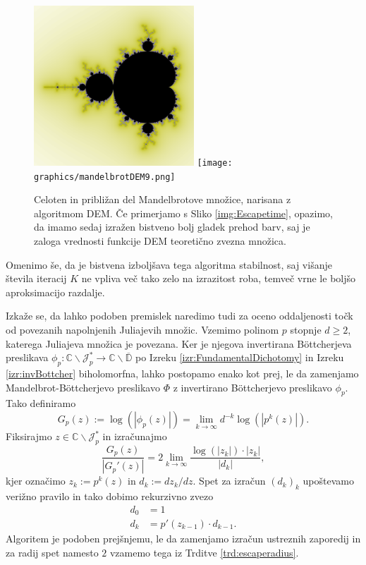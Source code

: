 \documentclass[12pt,a4paper]{amsart}
\theoremstyle{definition} %
\theoremstyle{plain} %
\newcommand{\CC}{\mathbb C}
\newcommand{\D}{\mathbb D} %
\newcommand{\J}{\mathscr J} %
\begin{document}
\begin{figure}[h]
\includegraphics[width=6cm]{graphics/mandelbrotDEM8.png}
\texttt{[image: graphics/mandelbrotDEM9.png]}
\caption{
Celoten in približan del Mandelbrotove množice, narisana z algoritmom DEM.
Če primerjamo s Sliko \ref{img:Escapetime}, opazimo, da imamo sedaj izražen bistveno 
bolj gladek prehod barv, saj je zaloga vrednosti funkcije DEM teoretično zvezna množica.
}
\end{figure}

\noindent Omenimo še, da je bistvena izboljšava tega algoritma stabilnost,
saj višanje števila iteracij $K$ ne vpliva več tako zelo na izrazitost roba, 
temveč vrne le boljšo aproksimacijo razdalje.

Izkaže se, da lahko podoben premislek naredimo tudi za oceno oddaljenosti točk od povezanih napolnjenih Juliajevih množic.
Vzemimo polinom $p$ stopnje $d\geq2$, katerega Juliajeva množica je povezana.
Ker je njegova invertirana B{\"o}ttcherjeva preslikava $\phi_p \colon \CC \smallsetminus \J_p^\ast \to \CC \smallsetminus \overline{\D}$
po Izreku \ref{izr:FundamentalDichotomy} in Izreku \ref{izr:invBottcher} biholomorfna, lahko postopamo enako kot prej, 
le da zamenjamo Mandelbrot-B{\"o}ttcherjevo preslikavo $\Phi$ z invertirano B{\"o}ttcherjevo preslikavo $\phi_p$.
Tako definiramo
$$G_p(z) := \log(|\phi_p(z)|) = \lim_{k\to\infty} d^{-k}\log(|p^k(z)|).$$
Fiksirajmo $z \in \CC \smallsetminus \J_p^\ast$ in izračunajmo
$$
\frac{G_p(z)}{|G_p'(z)|} = 2 \lim_{k\to\infty}\frac{\log(|z_k|) \cdot |z_k|}{|d_k|},
$$
kjer označimo $z_k := p^k(z)$ in $d_k := dz_k / dz$. 
Spet za izračun $(d_k)_k$ upoštevamo verižno pravilo in tako dobimo rekurzivno zvezo
\begin{align*}
d_0 &= 1 \\
d_k &= p'(z_{k-1}) \cdot d_{k-1}.
\end{align*}
Algoritem je podoben prejšnjemu, le da zamenjamo izračun ustreznih zaporedij 
in za radij spet namesto $2$ vzamemo tega iz Trditve \ref{trd:escaperadius}.
\end{document}
